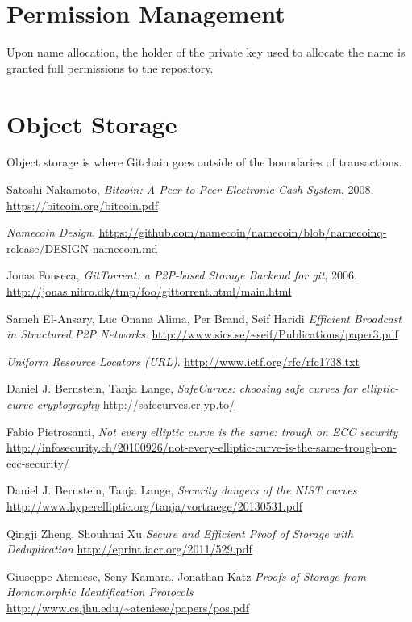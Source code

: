 \documentclass[a4paper]{article}
\begin{document}
\section{Permission Management}

Upon name allocation, the holder of the private key used to allocate the name is granted full permissions to the repository.

\section{Object Storage}

Object storage is where Gitchain goes outside of the boundaries of transactions.

\begin{thebibliography}{9}

  Satoshi Nakamoto,
  \emph{Bitcoin: A Peer-to-Peer Electronic Cash System}, 2008.
  \url{https://bitcoin.org/bitcoin.pdf}


  \emph{Namecoin Design}.
  \url{https://github.com/namecoin/namecoin/blob/namecoinq-release/DESIGN-namecoin.md}

  Jonas Fonseca,
  \emph{GitTorrent: a P2P-based Storage Backend for git}, 2006.
  \url{http://jonas.nitro.dk/tmp/foo/gittorrent.html/main.html}

   Sameh El-Ansary, Luc Onana Alima, Per Brand, Seif Haridi
   \emph{Efficient Broadcast in Structured P2P Networks}.
   \url{http://www.sics.se/~seif/Publications/paper3.pdf}

  \emph{Uniform Resource Locators (URL)}.
  \url{http://www.ietf.org/rfc/rfc1738.txt}

  Daniel J. Bernstein, Tanja Lange,
  \emph{SafeCurves: choosing safe curves for elliptic-curve cryptography}
  \url{http://safecurves.cr.yp.to/}

  Fabio Pietrosanti,
  \emph{Not every elliptic curve is the same: trough on ECC security}
  \url{http://infosecurity.ch/20100926/not-every-elliptic-curve-is-the-same-trough-on-ecc-security/}

  Daniel J. Bernstein, Tanja Lange,
  \emph{Security dangers of the NIST curves}
  \url{http://www.hyperelliptic.org/tanja/vortraege/20130531.pdf}

  Qingji Zheng, Shouhuai Xu
  \emph{Secure and Efficient Proof of Storage with Deduplication}
  \url{http://eprint.iacr.org/2011/529.pdf}

  Giuseppe Ateniese, Seny Kamara, Jonathan Katz
  \emph{Proofs of Storage from Homomorphic Identification Protocols}
  \url{http://www.cs.jhu.edu/~ateniese/papers/pos.pdf}

\end{thebibliography}
\end{document}
